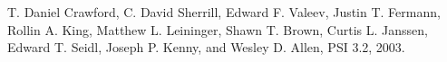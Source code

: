 T. Daniel Crawford, C. David Sherrill, Edward F. Valeev, Justin
T. Fermann, Rollin A. King, Matthew L. Leininger, Shawn T. Brown,
Curtis L. Janssen, Edward T. Seidl, Joseph P. Kenny, and Wesley D. Allen,
PSI 3.2, 2003.
